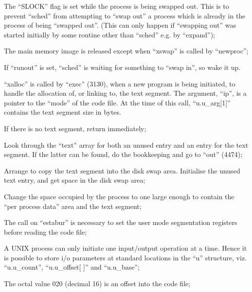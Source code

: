 \item[4379:] The ``SLOCK'' flag is set while the
process is being swapped out.
This is to prevent ``sched'' from
attempting to ``swap out'' a process which is already in the process of being ``swapped out''.
(This can only happen if ``swapping out'' was started initially
by some routine other than
``sched'' e.g. by ``expand'');

\item[4382:] The main memory image is released
 except when ``xswap'' is called by
 ``newproc'';

\item[4388:] If ``runout'' is set, ``sched'' is
 waiting for something to ``swap
 in'', so wake it up.
\ed


``xalloc'' is called by ``exec'' (3130),
when a new program is being initiated,
to handle the allocation of, or linking
to, the text segment. The argument,
``ip'', is a pointer to the ``mode'' of the
code file. At the time of this call,
``u.u\_arg[1]'' contains the text segment
size in bytes.

\bd
\item[4439:] If there is no text segment,
 return immediately;

\item[4441:] Look through the ``text'' array for
 both an unused entry and an entry
 for the text segment. If the
 latter can be found, do the bookkeeping and go to ``out'' (4474);

\item[4452:] Arrange to copy the text segment
 into the disk swap area. Initialise the unused text entry, and
 get space in the disk swap area;

\item[4459:] Change the space occupied by the
 process to one large enough to
 contain the ``per process data''
 area and the text segment;

\item[4460:] The call on ``estabur'' is necessary to set the user mode
segmentation registers before reading the code file;

\item[4461:] A UNIX process can only initiate
 one input/output operation at a
 time. Hence it is possible to
 store i/o parameters at standard
 locations in the ``u'' structure,
 viz. ``u.u\_count'', ``u.u\_offset[ ]'' and
``u.u\_base'';



\item[4462:] The octal value 020 (decimal 16)
 is an offset into the code file;

